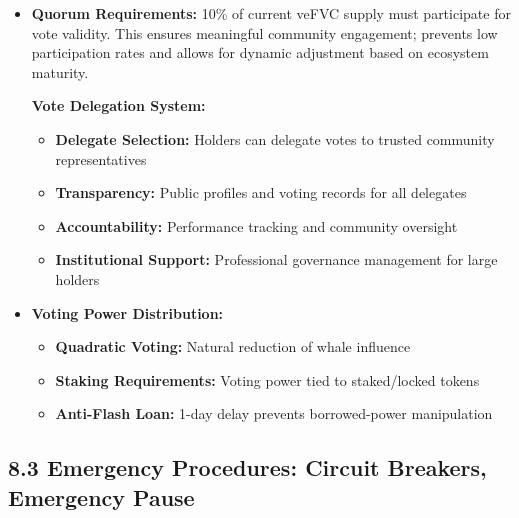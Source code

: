 \documentclass[
  paper=a4,
  ,captions=tableheading
]{scrartcl}
\providecommand{\tightlist}{%
  \setlength{\itemsep}{0pt}\setlength{\parskip}{0pt}}
\begin{document}
\begin{itemize}
\tightlist
\item
  \textbf{Quorum Requirements:} 10\% of current veFVC supply must
  participate for vote validity. This ensures meaningful community engagement; prevents low participation rates and allows for dynamic adjustment based on ecosystem maturity.

  \textbf{Vote Delegation System:}

  \begin{itemize}
  \tightlist
  \item
    \textbf{Delegate Selection:} Holders can delegate votes to trusted
    community representatives
  \item
    \textbf{Transparency:} Public profiles and voting records for all
    delegates
  \item
    \textbf{Accountability:} Performance tracking and community
    oversight
  \item
    \textbf{Institutional Support:} Professional governance management
    for large holders
  \end{itemize}
\item
  \textbf{Voting Power Distribution:}

  \begin{itemize}
  \tightlist
  \item
    \textbf{Quadratic Voting:} Natural reduction of whale influence
  \item
    \textbf{Staking Requirements:} Voting power tied to staked/locked
    tokens
  \item
    \textbf{Anti-Flash Loan:} 1-day delay prevents borrowed-power
    manipulation
  \end{itemize}
\end{itemize}

\subsection{8.3 Emergency Procedures: Circuit Breakers, Emergency
Pause}\label{emergency-procedures-circuit-breakers-emergency-pause}
\end{document}
